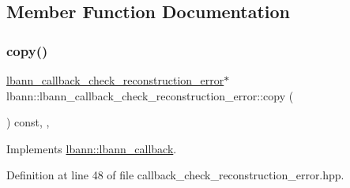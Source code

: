 \subsection{Member Function Documentation}
\mbox{\label{classlbann_1_1lbann__callback__check__reconstruction__error_a7c2367fdebae1798c6cbf2846c7492a3}} 
\subsubsection{\texorpdfstring{copy()}{copy()}}
{\footnotesize\ttfamily \hyperlink{classlbann_1_1lbann__callback__check__reconstruction__error}{lbann\+\_\+callback\+\_\+check\+\_\+reconstruction\+\_\+error}$\ast$ lbann\+::lbann\+\_\+callback\+\_\+check\+\_\+reconstruction\+\_\+error\+::copy (\begin{DoxyParamCaption}{ }\end{DoxyParamCaption}) const\hspace{0.3cm}{\ttfamily [inline]}, {\ttfamily [override]}, {\ttfamily [virtual]}}



Implements \hyperlink{classlbann_1_1lbann__callback_a9f545d1269a8c7af335625d049691f26}{lbann\+::lbann\+\_\+callback}.



Definition at line 48 of file callback\+\_\+check\+\_\+reconstruction\+\_\+error.\+hpp.


